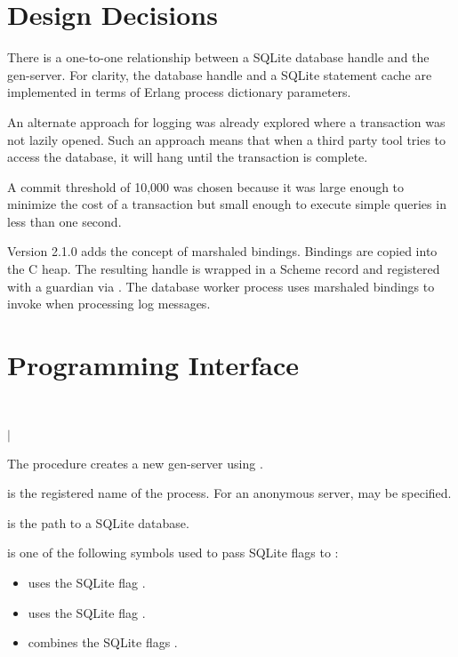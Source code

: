 \section {Design Decisions}

There is a one-to-one relationship between a SQLite database handle
and the  gen-server. For clarity, the database handle and a
SQLite statement cache are implemented in terms of Erlang process
dictionary parameters.

An alternate approach for logging was already explored where a
transaction was not lazily opened. Such an approach means that when a
third party tool tries to access the database, it will hang until the
transaction is complete.

A commit threshold of 10,000 was chosen because it was large enough to
minimize the cost of a transaction but small enough to execute simple
queries in less than one second.

Version 2.1.0 adds the concept of marshaled bindings. Bindings are
copied into the C heap. The resulting handle is wrapped in a Scheme
record and registered with a guardian via
. The database worker process uses
marshaled bindings to invoke  when processing log
messages.

\section {Programming Interface}

\begin{procedure}
  \\
\end{procedure}
\returns{}
 $|$

The  procedure creates a new 
gen-server using .

 is the registered name of the process. For an anonymous
server,  may be specified.

 is the path to a SQLite database.

 is one of the following symbols used to pass SQLite flags
to :

\antipar\begin{itemize}

\item {} uses the SQLite flag
  .

\item {} uses the SQLite flag
  .

\item {} combines the SQLite flags .
\end{itemize}

